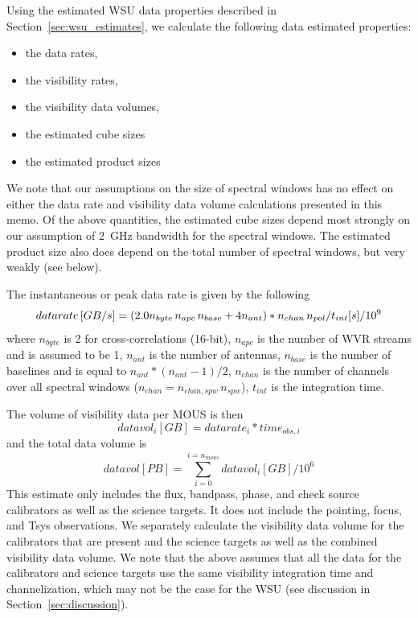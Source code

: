 \documentclass[preprint]{aastex631}
\begin{document}
Using the estimated WSU data properties described in Section~\ref{sec:wsu_estimates}, we calculate the following data estimated properties:
\begin{itemize}
\item the data rates,
\item the visibility rates,
\item the visibility data volumes,
\item the estimated cube sizes
\item the estimated product sizes
\end{itemize}
We note that our assumptions on the size of spectral windows has no effect on either the data rate and visibility data volume calculations presented in this memo. Of the above quantities, the estimated cube sizes depend most strongly on our assumption of 2~GHz bandwidth for the spectral windows. The estimated product size also does depend on the total number of spectral windows, but very weakly (see below).

The instantaneous or peak data rate is given by the following
\begin{equation}
  datarate \,  [GB/s] = (2.0 n_{byte} \, n_{apc} \, n_{base} + 4 n_{ant}) \\  *  n_{chan} \, n_{pol} / t_{int} [s] / 10^9
\end{equation}
where $n_{byte}$ is 2 for cross-correlations (16-bit), $n_{apc}$ is the number of WVR streams and is assumed to be 1, $n_{ant}$ is the number of antennas, $n_{base}$ is the number of baselines and is equal to $n_{ant}*(n_{ant} - 1)/2$,  $n_{chan}$ is the number of channels over all spectral windows ($n_{chan} = n_{chan,spw} \, n_{spw}$), $t_{int}$ is the integration time.


The volume of visibility data per MOUS  is then
\begin{equation}
datavol_i[GB] = datarate_i * time_{obs,i}
\end{equation}
and the total data volume is
\begin{equation}
  datavol[PB]  = \sum_{i=0}^{i=n_{mous}} datavol_i[GB] / 10^6
\end{equation}
This estimate only includes the flux, bandpass, phase, and check source calibrators as well as the science targets. It does not include the pointing, focus, and Tsys observations. We separately calculate  the visibility data volume for the calibrators that are present and the science targets as well as the combined visibility data volume. We note that the above assumes that all the data for the calibrators and science targets use the same visibility integration time and channelization, which may not be the case for the WSU (see discussion in Section~\ref{sec:discussion}). 
\end{document}
